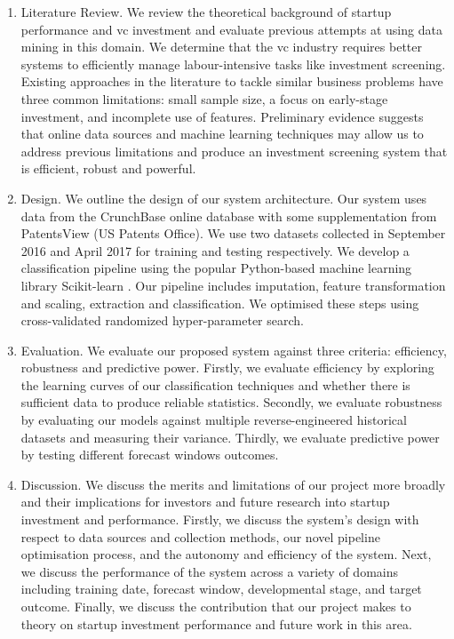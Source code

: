 \documentclass[../thesis/thesis.tex]{subfiles}
\begin{document}
\begin{enumerate}

\item Literature Review. We review the theoretical background of startup performance and \gls{vc} investment and evaluate previous attempts at using data mining in this domain. We determine that the \gls{vc} industry requires better systems to efficiently manage labour-intensive tasks like investment screening. Existing approaches in the literature to tackle similar business problems have three common limitations: small sample size, a focus on early-stage investment, and incomplete use of features. Preliminary evidence suggests that online data sources and machine learning techniques may allow us to address previous limitations and produce an investment screening system that is efficient, robust and powerful.

\item Design. We outline the design of our system architecture. Our system uses data from the CrunchBase online database with some supplementation from PatentsView (US Patents Office). We use two datasets collected in September 2016 and April 2017 for training and testing respectively. We develop a classification pipeline using the popular Python-based machine learning library Scikit-learn \cite{pedregosa2011}. Our pipeline includes imputation,  feature transformation and scaling, extraction and classification. We optimised these steps using cross-validated randomized hyper-parameter search.

\item Evaluation. We evaluate our proposed system against three criteria: efficiency, robustness and predictive power. Firstly, we evaluate efficiency by exploring the learning curves of our classification techniques and whether there is sufficient data to produce reliable statistics. Secondly, we evaluate robustness by evaluating our models against multiple reverse-engineered historical datasets and measuring their variance. Thirdly, we evaluate predictive power by testing different forecast windows outcomes.

\item Discussion. We discuss the merits and limitations of our project more broadly and their implications for investors and future research into startup investment and performance. Firstly, we discuss the system's design with respect to data sources and collection methods, our novel pipeline optimisation process, and the autonomy and efficiency of the system. Next, we discuss the performance of the system across a variety of domains including training date, forecast window, developmental stage, and target outcome. Finally, we discuss the contribution that our project makes to theory on startup investment performance and future work in this area.

\end{enumerate}

\end{document}
